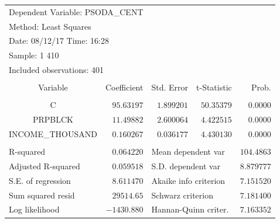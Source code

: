 \documentclass[12pt]{report}
\begin{document}
\begin{table}[H]
	\centering
	\begin{tabular}{lrrrr}
		\multicolumn{4}{l}{Dependent Variable: PSODA\_CENT}&\multicolumn{1}{c}{}\\
		\multicolumn{3}{l}{Method: Least Squares}&\multicolumn{1}{c}{}&\multicolumn{1}{c}{}\\
		\multicolumn{3}{l}{Date: 08/12/17   Time: 16:28}&\multicolumn{1}{c}{}&\multicolumn{1}{c}{}\\
		\multicolumn{2}{l}{Sample: 1 410}&\multicolumn{1}{c}{}&\multicolumn{1}{c}{}&\multicolumn{1}{c}{}\\
		\multicolumn{3}{l}{Included observations: 401}&\multicolumn{1}{c}{}&\multicolumn{1}{c}{}\\
		[4.5pt] \hline \\ [-4.5pt]
		\multicolumn{1}{c}{Variable}&\multicolumn{1}{r}{Coefficient}&\multicolumn{1}{r}{Std. Error}&\multicolumn{1}{r}{t-Statistic}&\multicolumn{1}{r}{Prob.}\\
		[4.5pt] \hline \\ [-4.5pt]
		\multicolumn{1}{c}{C}&\multicolumn{1}{r}{$95.63197$}&\multicolumn{1}{r}{$1.899201$}&\multicolumn{1}{r}{$50.35379$}&\multicolumn{1}{r}{$0.0000$}\\
		\multicolumn{1}{c}{PRPBLCK}&\multicolumn{1}{r}{$11.49882$}&\multicolumn{1}{r}{$2.600064$}&\multicolumn{1}{r}{$4.422515$}&\multicolumn{1}{r}{$0.0000$}\\
		\multicolumn{1}{c}{INCOME\_THOUSAND}&\multicolumn{1}{r}{$0.160267$}&\multicolumn{1}{r}{$0.036177$}&\multicolumn{1}{r}{$4.430130$}&\multicolumn{1}{r}{$0.0000$}\\
		[4.5pt] \hline \\ [-4.5pt]
		\multicolumn{1}{l}{R-squared}&\multicolumn{1}{r}{$0.064220$}&\multicolumn{2}{l}{Mean dependent var}&\multicolumn{1}{r}{$104.4863$}\\
		\multicolumn{1}{l}{Adjusted R-squared}&\multicolumn{1}{r}{$0.059518$}&\multicolumn{2}{l}{S.D. dependent var}&\multicolumn{1}{r}{$8.879777$}\\
		\multicolumn{1}{l}{S.E. of regression}&\multicolumn{1}{r}{$8.611470$}&\multicolumn{2}{l}{Akaike info criterion}&\multicolumn{1}{r}{$7.151520$}\\
		\multicolumn{1}{l}{Sum squared resid}&\multicolumn{1}{r}{$29514.65$}&\multicolumn{2}{l}{Schwarz criterion}&\multicolumn{1}{r}{$7.181400$}\\
		\multicolumn{1}{l}{Log likelihood}&\multicolumn{1}{r}{$-1430.880$}&\multicolumn{2}{l}{Hannan-Quinn criter.}&\multicolumn{1}{r}{$7.163352$}\\

\end{tabular}
\end{table}
\end{document}

